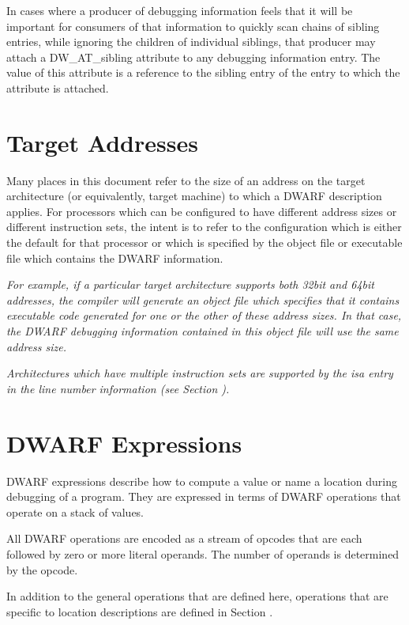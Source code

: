 In cases where a producer of debugging information feels that
it will be important for consumers of that information to
quickly scan chains of sibling entries, while ignoring the
children of individual siblings, that producer may attach a
DW\-\_AT\-\_sibling attribute to any debugging information entry. 
The
value of this attribute is a reference to the sibling entry
of the entry to which the attribute is attached.


\section{Target Addresses}
\label{chap:targetaddresses}
Many places in this document refer to the size of an address
on the target architecture (or equivalently, target machine)
to which a DWARF description applies. For processors which
can be configured to have different address sizes or different
instruction sets, the intent is to refer to the configuration
which is either the default for that processor or which is
specified by the object file or executable file which contains
the DWARF information.



\textit{
For example, if a particular target architecture supports
both 32\dash bit and 64\dash bit addresses, the compiler will generate
an object file which specifies that it contains executable
code generated for one or the other of these address sizes. In
that case, the DWARF debugging information contained in this
object file will use the same address size.
}

\textit{
Architectures which have multiple instruction sets are
supported by the isa entry in the line number information
(see Section ).
}


\section{DWARF Expressions}
\label{chap:dwarfexpressions}
DWARF expressions describe how to compute a value or name a
location during debugging of a program. 
They are expressed in
terms of DWARF operations that operate on a stack of values.

All DWARF operations are encoded as a stream of opcodes that
are each followed by zero or more literal operands. 
The number
of operands is determined by the opcode.  

In addition to the
general operations that are defined here, operations that are
specific to location descriptions are defined in 
Section  .

